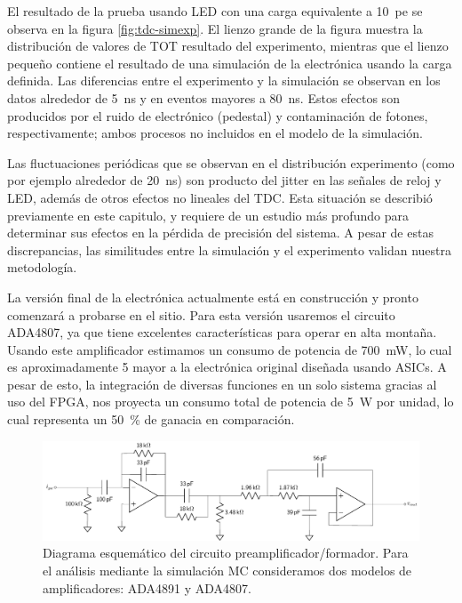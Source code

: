 El resultado de la prueba usando LED con una carga equivalente a \SI{10}{pe} se observa en la figura \ref{fig:tdc-simexp}. El lienzo grande de la figura muestra la distribución de valores de TOT resultado del experimento, mientras que el lienzo pequeño contiene el resultado de una simulación de la electrónica usando la carga definida. Las diferencias entre el experimento y la simulación se observan en los datos alrededor de \SI{5}{\ns} y en eventos mayores a \SI{80}{\ns}. Estos efectos son producidos por el ruido de electrónico (pedestal) y contaminación de fotones, respectivamente; ambos procesos no incluidos en el modelo de la simulación.

Las fluctuaciones periódicas que se observan en el distribución experimento (como por ejemplo alrededor de \SI{20}{\ns}) son producto del jitter en las señales de reloj y LED, además de otros efectos no lineales del TDC. Esta situación se describió previamente en este capitulo, y requiere de un estudio más profundo para determinar sus efectos en la pérdida de precisión del sistema. A pesar de estas discrepancias, las similitudes entre la simulación y el experimento validan nuestra metodología.

La versión final de la electrónica actualmente está en construcción y pronto comenzará a probarse en el sitio. Para esta versión usaremos el circuito ADA4807, ya que tiene excelentes características para operar en alta montaña. Usando este amplificador estimamos un consumo de potencia de \SI{700}{\mW}, lo cual es aproximadamente \num{5} mayor a la electrónica original diseñada usando ASICs. A pesar de esto, la integración de diversas funciones en un solo sistema gracias al uso del FPGA, nos proyecta un consumo total de potencia de \SI{5}{\W} por unidad, lo cual representa un \SI{50}{\percent} de ganacia en comparación.

\begin{figure}
        \centering
        \includegraphics[width=\textwidth]{preamp-shaper-final.pdf}
        \caption{Diagrama esquemático del circuito preamplificador/formador. Para el análisis mediante la simulación MC consideramos dos modelos de amplificadores: ADA4891 y ADA4807.}
        \label{fig:preamp-shaper}
\end{figure}

